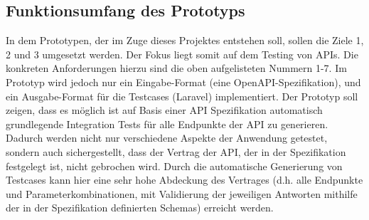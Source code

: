 \subsection{Funktionsumfang des Prototyps}

In dem Prototypen, der im Zuge dieses Projektes entstehen soll, sollen die Ziele 1, 2 und 3 umgesetzt werden. Der Fokus liegt somit auf dem Testing von APIs. Die konkreten Anforderungen hierzu sind die oben aufgelisteten Nummern 1-7. Im Prototyp wird jedoch nur ein Eingabe-Format (eine OpenAPI-Spezifikation), und ein Ausgabe-Format für die Testcases (Laravel) implementiert. Der Prototyp soll zeigen, dass es möglich ist auf Basis einer API Spezifikation automatisch grundlegende Integration Tests für alle Endpunkte der API zu generieren. Dadurch werden nicht nur verschiedene Aspekte der Anwendung getestet, sondern auch sichergestellt, dass der Vertrag der API, der in der Spezifikation festgelegt ist, nicht gebrochen wird. Durch die automatische Generierung von Testcases kann hier eine sehr hohe Abdeckung des Vertrages (d.h. alle Endpunkte und Parameterkombinationen, mit Validierung der jeweiligen Antworten mithilfe der in der Spezifikation definierten Schemas) erreicht werden.\\